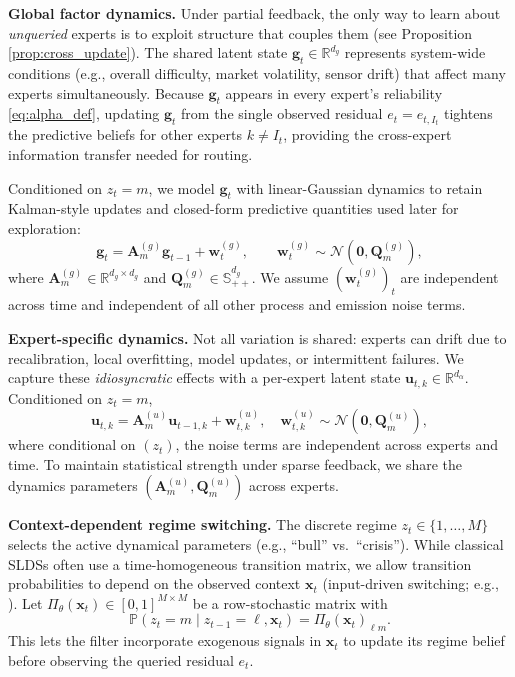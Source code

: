 \textbf{Global factor dynamics.}
Under partial feedback, the only way to learn about \emph{unqueried} experts is to exploit structure
that couples them (see Proposition \ref{prop:cross_update}). The shared latent state
\(\mathbf{g}_t\in\mathbb{R}^{d_g}\) represents system-wide conditions (e.g., overall difficulty,
market volatility, sensor drift) that affect many experts simultaneously. Because \(\mathbf{g}_t\)
appears in every expert's reliability \eqref{eq:alpha_def}, updating \(\mathbf{g}_t\) from the single
observed residual \(e_t=e_{t,I_t}\) tightens the predictive beliefs for other experts \(k\neq I_t\),
providing the cross-expert information transfer needed for routing.

Conditioned on \(z_t=m\), we model \(\mathbf{g}_t\) with linear-Gaussian dynamics to retain Kalman-style
updates and closed-form predictive quantities used later for exploration:
\begin{equation}
\label{eq:global_dynamics}
\mathbf{g}_t
=
\mathbf{A}^{(g)}_{m}\mathbf{g}_{t-1}+\mathbf{w}^{(g)}_{t},
\qquad
\mathbf{w}^{(g)}_{t}\sim\mathcal{N}(\mathbf{0},\mathbf{Q}^{(g)}_{m}),
\end{equation}
where \(\mathbf{A}^{(g)}_{m}\in\mathbb{R}^{d_g\times d_g}\) and
\(\mathbf{Q}^{(g)}_{m}\in\mathbb{S}^{d_g}_{++}\).
We assume \((\mathbf{w}^{(g)}_{t})_{t}\) are independent across time and independent of all other
process and emission noise terms.

\textbf{Expert-specific dynamics.}
Not all variation is shared: experts can drift due to recalibration, local overfitting, model
updates, or intermittent failures. We capture these \emph{idiosyncratic} effects with a per-expert
latent state \(\mathbf{u}_{t,k}\in\mathbb{R}^{d_\alpha}\). Conditioned on \(z_t=m\),
\begin{equation}
\label{eq:idiosyncratic_dynamics}
\mathbf{u}_{t,k}
=
\mathbf{A}^{(u)}_{m}\mathbf{u}_{t-1,k}+\mathbf{w}^{(u)}_{t,k},
\quad
\mathbf{w}^{(u)}_{t,k}\sim\mathcal{N}(\mathbf{0},\mathbf{Q}^{(u)}_{m}),
\end{equation}
where conditional on \((z_t)\), the noise terms are independent across experts and time.
To maintain statistical strength under sparse feedback, we share the dynamics parameters
\((\mathbf{A}^{(u)}_{m},\mathbf{Q}^{(u)}_{m})\) across experts.

\textbf{Context-dependent regime switching.}
The discrete regime \(z_t\in\{1,\dots,M\}\) selects the active dynamical parameters (e.g., ``bull'' vs.\ ``crisis'').
While classical SLDSs often use a time-homogeneous transition matrix, we allow transition
probabilities to depend on the observed context \(\mathbf{x}_t\) (input-driven switching; e.g.,
\citet{bengio1994input}). Let
\(\Pi_\theta(\mathbf{x}_t)\in[0,1]^{M\times M}\) be a row-stochastic matrix with
\begin{equation*}
    \mathbb{P}(z_t=m \mid z_{t-1}=\ell,\mathbf{x}_t)=\Pi_\theta(\mathbf{x}_t)_{\ell m}.
\end{equation*}
This lets the filter incorporate exogenous signals in \(\mathbf{x}_t\) to update its regime belief
before observing the queried residual \(e_t\).

